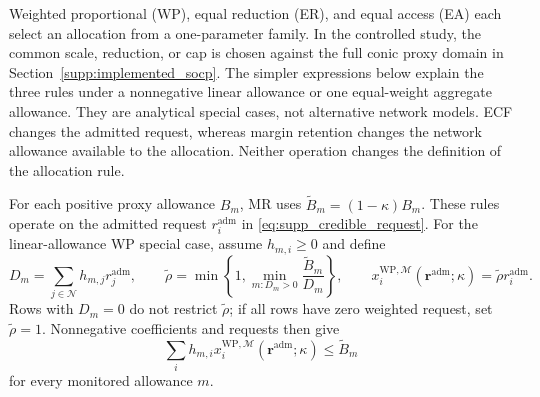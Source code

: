 \documentclass[11pt]{article}
\begin{document}
Weighted proportional (WP), equal reduction (ER), and equal access (EA) each
select an allocation from a one-parameter family. In the controlled study, the
common scale, reduction, or cap is chosen against the full conic proxy domain in
Section~\ref{supp:implemented_socp}. The simpler expressions below explain the
three rules under a nonnegative linear allowance or one equal-weight aggregate
allowance. They are analytical special cases, not alternative network models.
ECF changes the admitted request, whereas margin retention changes the network
allowance available to the allocation. Neither operation changes the definition
of the allocation rule.

For each positive proxy allowance $B_m$, MR uses
$\widetilde B_m=(1-\kappa)B_m$. These rules operate on the admitted request
$r_i^{\mathrm{adm}}$ in \eqref{eq:supp_credible_request}.
For the linear-allowance WP special case, assume $h_{m,i}\ge0$ and define
\begin{equation}
D_m=\sum_{j\in\mathcal N}h_{m,j}r_j^{\mathrm{adm}},
\qquad
\tilde\rho=\min\!\left\{1,\min_{m:D_m>0}
\frac{\widetilde B_m}{D_m}\right\},
\qquad
x_i^{\mathrm{WP},\mathcal M}(\mathbf r^{\mathrm{adm}};\kappa)
=\tilde\rho r_i^{\mathrm{adm}}.
\label{eq:supp_wp_linear_allowance}
\end{equation}
Rows with $D_m=0$ do not restrict $\tilde\rho$; if all rows have zero weighted
request, set $\tilde\rho=1$. Nonnegative coefficients and requests then give
\[
\sum_i h_{m,i}x_i^{\mathrm{WP},\mathcal M}
(\mathbf r^{\mathrm{adm}};\kappa)\le\widetilde B_m
\]
for every monitored allowance $m$.
\end{document}
